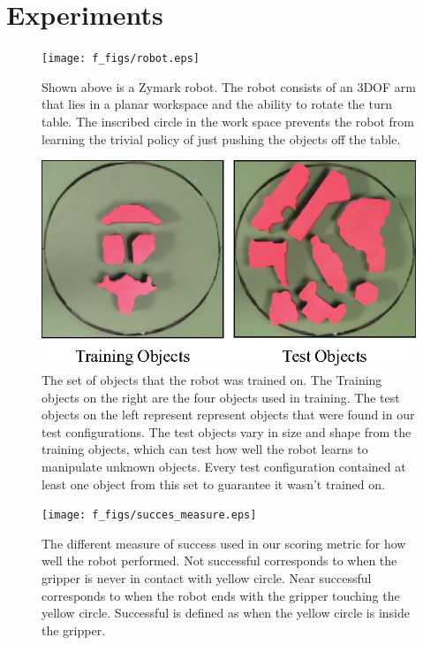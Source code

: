\documentclass[10pt, conference]{ieeeconf}      %
\begin{document}
\section{Experiments} \label{sec:Exp}
\begin{figure}[t]
\centering

\texttt{[image: f\_figs/robot.eps]}

\caption{\footnotesize  Shown above is a Zymark robot. The robot consists of an 3DOF arm that lies in a planar workspace and the ability to rotate the turn table. The inscribed circle in the work space prevents the robot from learning the trivial policy of just pushing the objects off the table.}

\label{fig:robot}
\end{figure}

\begin{figure}[t]
\centering
\includegraphics{f_figs/shapes_set.eps}

\caption{\footnotesize  The set of objects that the robot was trained on. The Training objects on the right are the four objects used in training. The test objects on the left represent represent objects that were found in our test configurations. The test objects vary in size and shape from the training objects, which can test how well the robot learns to manipulate unknown objects. Every test configuration contained at least one object from this set to guarantee it wasn't trained on.  }

\label{fig:shape_set}
\end{figure}


\begin{figure}[t]
\centering
\texttt{[image: f\_figs/succes\_measure.eps]}

\caption{\footnotesize  The different measure of success used in our scoring metric for how well the robot performed.  Not successful corresponds to when the gripper is never in contact with yellow circle. Near successful corresponds to when the robot ends with the gripper touching the yellow circle. Successful is defined as when the yellow circle is inside the gripper. }
\vspace*{-20pt}
\label{fig:suc_meas}
\end{figure}
\end{document}
